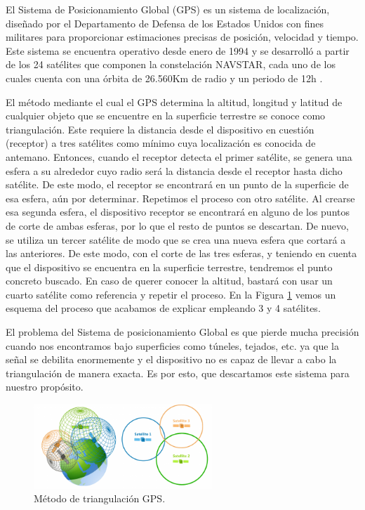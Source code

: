 El Sistema de Posicionamiento Global (GPS) es un sistema de localización, diseñado por el Departamento de
Defensa de los Estados Unidos con fines militares para proporcionar estimaciones precisas de posición,
velocidad y tiempo. Este sistema se encuentra operativo desde enero de 1994 y se desarrolló a partir de los 24 satélites que componen la constelación NAVSTAR, cada uno de los cuales cuenta con una órbita de 26.560Km de radio y un periodo de 12h \citep{pozo2000sistema}. 

El método mediante el cual el GPS determina la altitud, longitud y latitud de cualquier objeto que se encuentre en la superficie terrestre se conoce como triangulación. Este requiere la distancia desde el dispositivo en cuestión (receptor) a tres satélites como mínimo cuya localización es conocida de antemano. Entonces, cuando el receptor detecta el primer satélite, se genera una esfera a su alrededor cuyo radio será la distancia desde el receptor hasta dicho satélite. De este modo, el receptor se encontrará en un punto de la superficie de esa esfera, aún por determinar. Repetimos el proceso con otro satélite. Al crearse esa segunda esfera, el dispositivo receptor se encontrará en alguno de los puntos de corte de ambas esferas, por lo que el resto de puntos se descartan. De nuevo, se utiliza un tercer satélite de modo que se crea una nueva esfera que cortará a las
anteriores. De este modo, con el corte de las tres esferas, y teniendo en cuenta que el dispositivo se encuentra en la superficie terrestre, tendremos el punto concreto buscado. En caso de querer conocer la altitud, bastará con usar un cuarto satélite como referencia y repetir el proceso. En la Figura \ref{fig:ejemplogps} vemos un esquema del proceso que acabamos de explicar empleando 3 y 4 satélites.

El problema del Sistema de posicionamiento Global es que pierde mucha precisión cuando nos encontramos bajo superficies como túneles, tejados, etc. ya que la señal se debilita enormemente y el dispositivo no es capaz de llevar a cabo la triangulación de manera exacta. Es por esto, que descartamos este sistema para nuestro propósito.

\begin{figure}[t]
	\centering
	\includegraphics[width=0.6\textwidth]{Imagenes/Estadodelacuestion/triangulacion}
	\caption{Método de triangulación GPS. }
	\label{fig:ejemplogps}
\end{figure}


